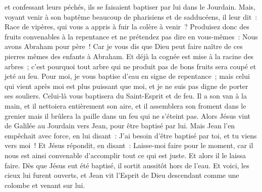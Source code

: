 \begin{multicols}{2}
et confessant leurs péchés, ils se faisaient baptiser par lui dans le Jourdain.
Mais, voyant venir à son baptême beaucoup de pharisiens et de sadducéens, il leur dit~: Race de vipères, qui vous a appris à fuir la colère à venir~?
Produisez donc des fruits convenables à la repentance
et ne prétendez pas dire en vous-mêmes~: Nous avons Abraham pour père~! Car je vous dis que Dieu peut faire naître de ces pierres mêmes des enfants à Abraham.
Et déjà la cognée est mise à la racine des arbres~; c'est pourquoi tout arbre qui ne produit pas de bons fruits sera coupé et jeté au feu.
Pour moi, je vous baptise d'eau en signe de repentance~; mais celui qui vient après moi est plus puissant que moi, et je ne suis pas digne de porter ses souliers. Celui-là vous baptisera du Saint-Esprit et de feu.
Il a son van à la main, et il nettoiera entièrement son aire, et il assemblera son froment dans le grenier mais il brûlera la paille dans un feu qui ne s'éteint pas.
Alors Jésus vint de Galilée au Jourdain vers Jean, pour être baptisé par lui.
Mais Jean l'en empêchait avec force, en lui disant~: J'ai besoin d'être baptisé par toi, et tu viens vers moi~!
Et Jésus répondit, en disant~: Laisse-moi faire pour le moment, car il nous est ainsi convenable d'accomplir tout ce qui est juste. Et alors il le laissa faire.
Dès que Jésus eut été baptisé, il sortit aussitôt hors de l'eau. Et voici, les cieux lui furent ouverts, et Jean vit l'Esprit de Dieu descendant comme une colombe et venant sur lui.

\end{multicols}
